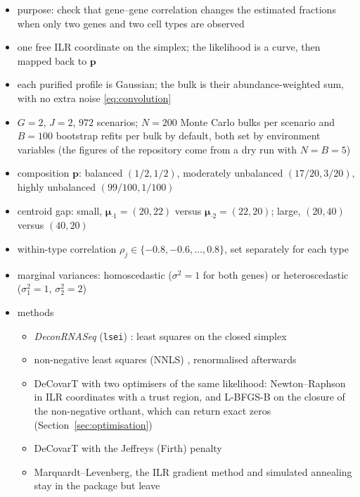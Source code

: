 \documentclass[pdflatex, sn-nature]{sn-jnl}
\theoremstyle{thmstyleone}%
\theoremstyle{thmstyletwo}%
\theoremstyle{thmstylethree}%
\begin{document}
\begin{itemize}
  \item purpose: check that gene--gene correlation changes the estimated fractions
        when only two genes and two cell types are observed
  \item one free ILR coordinate on the simplex;
        the likelihood is a curve, then mapped back to \(\boldsymbol{p}\)
  \item each purified profile is Gaussian;
        the bulk is their abundance-weighted sum, with no extra noise
        \eqref{eq:convolution}
  \item \(G=2\), \(J=2\), \(972\) scenarios; \(N=200\) Monte Carlo bulks per scenario and
        \(B=100\) bootstrap refits per bulk by default, both set by environment variables
        (the figures of the repository come from a dry run with \(N=B=5\))
  \item composition \(\boldsymbol{p}\): balanced \((1/2,1/2)\),
        moderately unbalanced \((17/20,3/20)\),
        highly unbalanced \((99/100,1/100)\)
  \item centroid gap: small, \(\boldsymbol{\mu}_{\cdot 1}=(20,22)\) versus
        \(\boldsymbol{\mu}_{\cdot 2}=(22,20)\);
        large, \((20,40)\) versus \((40,20)\)
  \item within-type correlation \(\rho_{j}\in\{-0.8,-0.6,\ldots,0.8\}\),
        set separately for each type
  \item marginal variances: homoscedastic ($\sigma^{2}=1$ for both genes) or heteroscedastic
        ($\sigma_{1}^{2}=1$, $\sigma_{2}^{2}=2$)
  \item methods
  \begin{itemize}
    \item \emph{DeconRNASeq} (\texttt{lsei}) \cite{gongDeconRNASeqStatisticalFramework2013}: least squares on the
          closed simplex
    \item non-negative least squares (NNLS) \cite{dessoleLawsonHansonAlgorithmDeviation2023}, renormalised afterwards
    \item DeCovarT with two optimisers of the same likelihood: Newton--Raphson in ILR coordinates with a trust
          region, and L-BFGS-B on the closure of the non-negative orthant, which can return exact zeros
          (Section~\ref{sec:optimisation})
    \item DeCovarT with the Jeffreys (Firth) penalty \cite{firthBiasReductionMaximum1993}
    \item Marquardt--Levenberg, the ILR gradient method and simulated annealing stay in the package but leave

\end{itemize}
\end{itemize}
\end{document}
